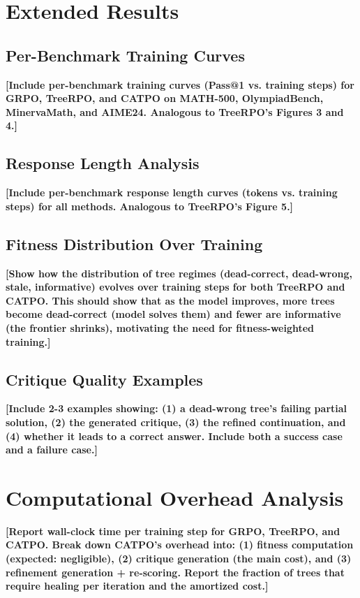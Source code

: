 \documentclass{article} %
\newcommand{\placeholder}[1]{{\color{red}\textbf{[#1]}}}
\begin{document}
\section{Extended Results}
\label{app:extended}

\subsection{Per-Benchmark Training Curves}

\placeholder{Include per-benchmark training curves (Pass@1 vs. training steps) for GRPO, TreeRPO, and CATPO on MATH-500, OlympiadBench, MinervaMath, and AIME24. Analogous to TreeRPO's Figures 3 and 4.}

\subsection{Response Length Analysis}

\placeholder{Include per-benchmark response length curves (tokens vs. training steps) for all methods. Analogous to TreeRPO's Figure 5.}

\subsection{Fitness Distribution Over Training}

\placeholder{Show how the distribution of tree regimes (dead-correct, dead-wrong, stale, informative) evolves over training steps for both TreeRPO and CATPO. This should show that as the model improves, more trees become dead-correct (model solves them) and fewer are informative (the frontier shrinks), motivating the need for fitness-weighted training.}

\subsection{Critique Quality Examples}

\placeholder{Include 2-3 examples showing: (1) a dead-wrong tree's failing partial solution, (2) the generated critique, (3) the refined continuation, and (4) whether it leads to a correct answer. Include both a success case and a failure case.}


\section{Computational Overhead Analysis}
\label{app:compute}

\placeholder{Report wall-clock time per training step for GRPO, TreeRPO, and CATPO. Break down CATPO's overhead into: (1) fitness computation (expected: negligible), (2) critique generation (the main cost), and (3) refinement generation + re-scoring. Report the fraction of trees that require healing per iteration and the amortized cost.}
\end{document}
